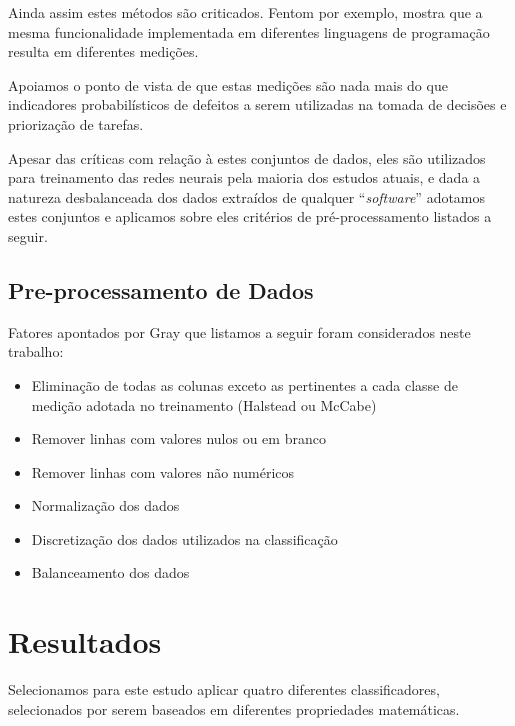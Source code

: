 \documentclass[10pt]{article}
\begin{document}
        Ainda assim estes métodos são criticados. Fentom \cite{fenton1997software} por exemplo, mostra que a mesma funcionalidade implementada em diferentes linguagens de programação resulta em diferentes medições.

        Apoiamos o ponto de vista de que estas medições são nada mais do que indicadores probabilísticos de defeitos a serem utilizadas na tomada de decisões e priorização de tarefas.

        Apesar das críticas com relação à estes conjuntos de dados, eles são utilizados para treinamento das redes neurais pela maioria dos estudos \cite{gray2011misuse,shepperdDataQualityComments2013} atuais, e dada a natureza desbalanceada dos dados extraídos de qualquer ``\textit{software}'' \cite{ryu2016effective} adotamos estes conjuntos e aplicamos sobre eles critérios de pré-processamento listados a seguir.

    \subsection{Pre-processamento de Dados}

        Fatores apontados por Gray \cite{gray2011misuse} que listamos a seguir foram considerados neste trabalho:

        \begin{itemize}
            \item Eliminação de todas as colunas exceto as pertinentes a cada classe de medição adotada no treinamento (Halstead ou McCabe)
            \item Remover linhas com valores nulos ou em branco
            \item Remover linhas com valores não numéricos
            \item Normalização dos dados
            \item Discretização dos dados utilizados na classificação
            \item Balanceamento dos dados
        \end{itemize}


\section{Resultados}

    Selecionamos para este estudo aplicar quatro diferentes classificadores, selecionados por serem baseados em diferentes propriedades matemáticas.
\end{document}
